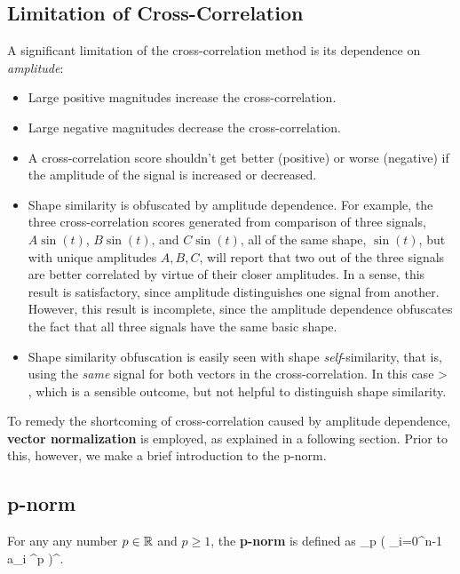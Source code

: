 \subsection{Limitation of Cross-Correlation}
A significant limitation of the cross-correlation method is its 
dependence on {\em amplitude}:
\begin{itemize}
\item Large positive magnitudes increase the cross-correlation.
\item Large negative magnitudes decrease the cross-correlation.
\item A cross-correlation score shouldn't get better (positive) or
worse (negative) if the amplitude of the signal is increased or decreased.
\item Shape similarity is obfuscated by amplitude dependence.  For 
example, the three cross-correlation scores generated from comparison 
of three signals, $A \sin(t)$, $B \sin(t)$, and $C \sin(t)$, 
all of the same shape, $\sin(t)$, but with unique
amplitudes $A, B, C$, will report that two 
out of the three signals are 
better correlated by virtue of their 
closer amplitudes.  In a sense, 
this result is satisfactory, since 
amplitude distinguishes one signal
from another.  However, this result 
is incomplete, since the amplitude 
dependence obfuscates the fact that 
all three signals have the same 
basic shape.
\item Shape similarity obfuscation is easily seen with shape 
{\em self}-similarity, that is, using the {\em same} signal for both vectors in the
cross-correlation.  In this case 
\be
  \va \cdot \va > \va \cdot {}, 
\ee
which is a sensible outcome, but not helpful to distinguish shape
similarity.
\end{itemize}

To remedy the shortcoming of cross-correlation caused by amplitude
dependence, {\bf vector normalization} is employed, as explained 
in a following section.  Prior to this, however, we make a brief 
introduction to the p-norm.

\subsection{p-norm}
\label{sec:pnorm}
For any any number $p \in \mathbb{R}$ and $p \geq 1$, the {\bf p-norm} 
is defined as
\be
 \parallel \va \parallel_p
 \;  \left( 
 \sum_{i=0}^{n-1} \mid a_i \mid^p 	 
 \right)^{}.
\ee

